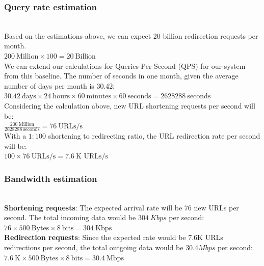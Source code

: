 \subsubsection{Query rate estimation}\label{ExYUBqhw5yrHlJBM6DHd1}
\\
Based on the estimations above, we can expect 20 billion redirection requests per month.
\\
\protect{}\label{katex_inline_loe2-P3Rk3YG65jcYuC0F}{{{\(200\ \text{Million} \times 100 = 20\ \text{Billion}\)}}}
\\
We can extend our calculations for Queries Per Second (QPS) for our system from this baseline. The number of seconds in one month, given the average number of days per month is 30.42:
\\
\protect{}\label{katex_inline_YcJ0Y5V9emM-okBVDH334}{{{\(30.42\ \text{days} \times 24\ \text{hours} \times 60\ \text{minutes} \times 60\ \text{seconds} = 2628288\ \text{seconds}\)}}}
\\
Considering the calculation above, new URL shortening requests per second will be:
\\
\protect{}\label{katex_inline_t9hw3OCrDAqYvvynaEW3F}{{{\(\frac{200\ \text{Million}}{2628288\ \text{seconds}} = 76\ \text{URLs/s}\)}}}
\\
With a \protect{}\label{katex_inline_AjCeb41XyiS7LScDNcRUm}{{{\(1:100\)}}} shortening to redirecting ratio, the URL redirection rate per second will be:
\\
\protect{}\label{katex_inline_I294c2H7Kgz3mv1SBGoyP}{{{\(100 \times 76\ \text{URLs/s} = 7.6\ \text{K URLs/s}\)}}}

\subsubsection{Bandwidth estimation}\label{D0fab9ZpPt5rAQnMu-rkw}
\\
\textbf{Shortening requests}: The expected arrival rate will be 76 new URLs per second. The total incoming data would be \protect{}\label{katex_inline_BUI_8qkxgQd1JoJeKLzMd}{{{\(304\ Kbps\)}}} per second:
\\
\protect{}\label{katex_inline_WuB5YdQp_JYDz49ollTxm}{{{\(76 \times 500\ \text{Bytes} \times 8\ \text{bits} = 304\ \text{Kbps}\)}}}
\\
\textbf{Redirection requests}: Since the expected rate would be 7.6K URLs redirections per second, the total outgoing data would be \protect{}\label{katex_inline_6Dt8c0swK0Wc1dencFr43}{{{\(30.4 Mbps\)}}} per second: \protect{}\label{katex_inline_nECaVHoJLyJ_EGRmLsUZV}{{{\(7.6\ \text{K} \times 500\ \text{Bytes} \times 8\ \text{bits} = 30.4\ \text{Mbps}\)}}}

